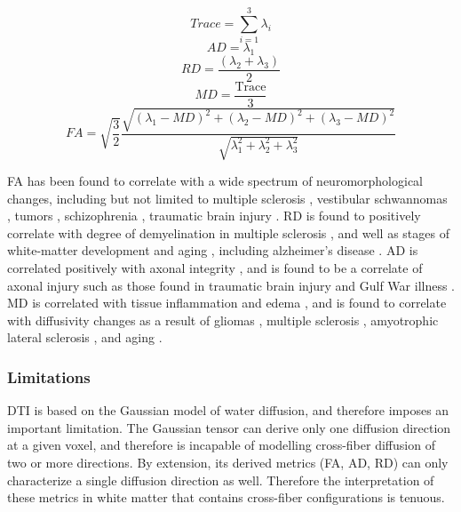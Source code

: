 \begin{equation}
Trace = \sum_{i=1}^{3} \lambda_i
\end{equation}
\begin{equation}
AD = \lambda_1
\end{equation}
\begin{equation}
RD = \frac{(\lambda_2+\lambda_3)}{2}
\end{equation}
\begin{equation}
MD = \frac{\text{Trace}}{3}
\end{equation}
\begin{equation}
FA = \sqrt{\frac{3}{2}}\frac{\sqrt{(\lambda_1-MD)^2 + (\lambda_2-MD)^2 + (\lambda_3-MD)^2}}{\sqrt{\lambda_1^2+\lambda_2^2+\lambda_3^2}}
\end{equation}

FA has been found to correlate with a wide spectrum of neuromorphological changes, including but not limited to multiple sclerosis , vestibular schwannomas , tumors , schizophrenia , traumatic brain injury . RD is found to positively correlate with degree of demyelination in multiple sclerosis , and well as stages of white-matter development and aging , including alzheimer's disease . AD is correlated positively with axonal integrity , and is found to be a correlate of axonal injury  such as those found in traumatic brain injury  and Gulf War illness . MD is correlated with tissue inflammation and edema , and is found to correlate with diffusivity changes as a result of gliomas , multiple sclerosis , amyotrophic lateral sclerosis , and aging .

\subsubsection{Limitations}

DTI is based on the Gaussian model of water diffusion, and therefore imposes an important limitation. The Gaussian tensor can derive only one diffusion direction at a given voxel, and therefore is incapable of modelling cross-fiber diffusion of two or more directions. By extension, its derived metrics (FA, AD, RD) can only characterize a single diffusion direction as well. Therefore the interpretation of these metrics in white matter that contains cross-fiber configurations is tenuous.  

